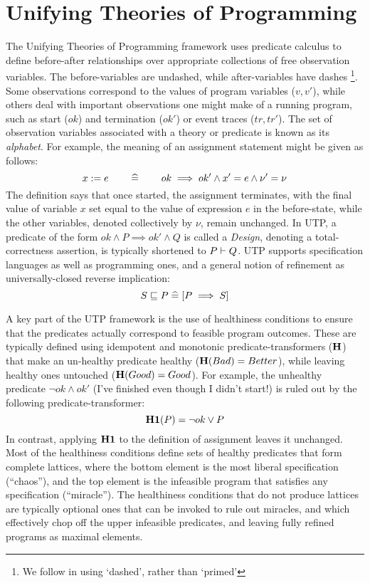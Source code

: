 \section{Unifying Theories of Programming}\label{ha:UTP}

The Unifying Theories of Programming framework \cite{Hoare-He98}
uses predicate calculus to define before-after relationships
over appropriate collections of free observation variables.
The before-variables are undashed,
while after-variables have dashes%
\footnote{%
We follow \cite[\S1,p25]{Hoare-He98} in using `dashed',
rather than `primed'
}.
Some observations correspond to the values of program variables ($v,v'$),
while others deal with  important observations one might make of
a running program,
such as start ($ok$) and termination ($ok'$)
or event traces ($tr,tr'$).
The set of observation variables associated with a theory
or predicate is known as its \emph{alphabet}.
For example,
the meaning of an assignment statement might be given as follows:
\begin{equation*}
  x := e  \qquad\mathrel{\widehat=}\qquad  ok \implies ok' \land x' = e \land \nu'=\nu
\end{equation*}
The definition says that once started, the assignment terminates,
with the final value of variable $x$ set equal
to the value of expression $e$ in the before-state,
while the other variables, denoted collectively by $\nu$, remain unchanged.
In UTP,
a predicate of the form $ok \land P \implies ok' \land Q$
is called a \emph{Design},
denoting a total-correctness assertion,
is typically shortened to $P \vdash Q$.
UTP supports specification languages as well as programming
ones, and a general notion of refinement as universally-closed
reverse implication:
\begin{equation*}
  S \sqsubseteq P \mathrel{\widehat=} [ P \implies S ]
\end{equation*}

A key part of the UTP framework is the use of healthiness conditions
to ensure that the predicates actually correspond to feasible program
outcomes.
These are typically defined
using idempotent and monotonic predicate-transformers ($\mathbf{{H}{}}$)
that make an un-healthy predicate healthy ($\mathbf{{H}{}}(Bad) = Better$),
while leaving healthy ones untouched ($\mathbf{{H}{}}(Good) = Good$).
For example, the unhealthy predicate $\lnot ok \land ok'$
(I've finished even though I didn't start!)
is ruled out by the following predicate-transformer:
\begin{equation*}
   \mathbf{{H}{1}}(P) =  \lnot ok \lor P
\end{equation*}
In contrast,
applying $\mathbf{{H}{1}}$ to the definition of assignment leaves it unchanged.
Most of the healthiness conditions define sets of healthy predicates
that form complete lattices,
where the bottom element is the most liberal specification (``chaos''),
and the top element is
the infeasible program that satisfies any specification (``miracle'').
The healthiness conditions that do not produce lattices
are typically optional ones that can be invoked to rule out miracles,
and which effectively chop off the upper infeasible predicates,
and leaving fully refined programs as maximal elements.

\DRAFT{}

